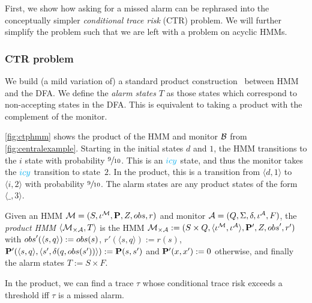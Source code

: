 \documentclass[runningheads]{llncs}
\newcommand{\icy}{{\color{cyan} icy}\xspace}
\newcommand{\missedalarms}[2]{\mathsf{mA}_{#1}^{#2}}
\newcommand{\defeq}{:=}
\begin{document}
First, we show how asking for a missed alarm can be rephrased into the conceptually simpler \emph{conditional trace risk} (CTR) problem.
We will further simplify the problem such that we are left with a problem on acyclic HMMs.


\subsubsection{CTR problem}
We build (a mild variation of) a standard product construction~\cite{baierPrinciplesModelChecking2008} between HMM and the DFA.  We define the \emph{alarm states} $T$ as those states which correspond to non-accepting states in the DFA. This is equivalent to taking a product with the complement of the monitor.
\begin{example}
    \label{ex:hmmproduct}
    \cref{fig:ctphmm} shows the product of the HMM and monitor $\mathcal{B}$ from \cref{fig:centralexample}. Starting in the initial states $d$ and $1$, the HMM transitions to the $i$ state with probability $\sfrac{9}{10}$. This is an $\icy$ state, and thus the monitor takes the $\icy$ transition to state~$2$. In the product, this is a transition from $\langle d, 1\rangle$ to $\langle i, 2\rangle$ with probability $\sfrac{9}{10}$. The alarm states are any product states of the form $\langle \_ ,3 \rangle$.
\end{example}
\begin{definition}
    \label{def:product}
    Given an HMM $\mathcal{M}=(S, \iota^{\mathcal{M}}, \mathbf{P}, Z, {obs}, r)$ and monitor $\mathcal{A}=(Q, \Sigma, \delta, \iota^{\mathcal{A}}, F)$, the \emph{product HMM} $\langle\mathcal{M}_{\times \mathcal{A}}, T\rangle$ is the HMM  $\mc_{\times \dfa} \defeq (S \times Q, \langle\iota^\mc,\iota^\dfa\rangle, \ptrans', Z, \obsf', r')$ with $\obsf'(\langle s, q\rangle) \defeq \obsf(s)$,  $r'(\langle s, q\rangle) \defeq r(s)$, $\ptrans'(\langle s, q\rangle, \langle s', \delta(q, \obsf(s'))\rangle) \defeq \ptrans(s, s')$ and $\ptrans'(x, x') \defeq 0$ otherwise, and finally the alarm states $T \defeq S\times F$.
\end{definition}
In the product, we can find a trace $\tau$ whose conditional trace risk exceeds a threshold iff $\tau$ is a missed alarm.
\end{document}

